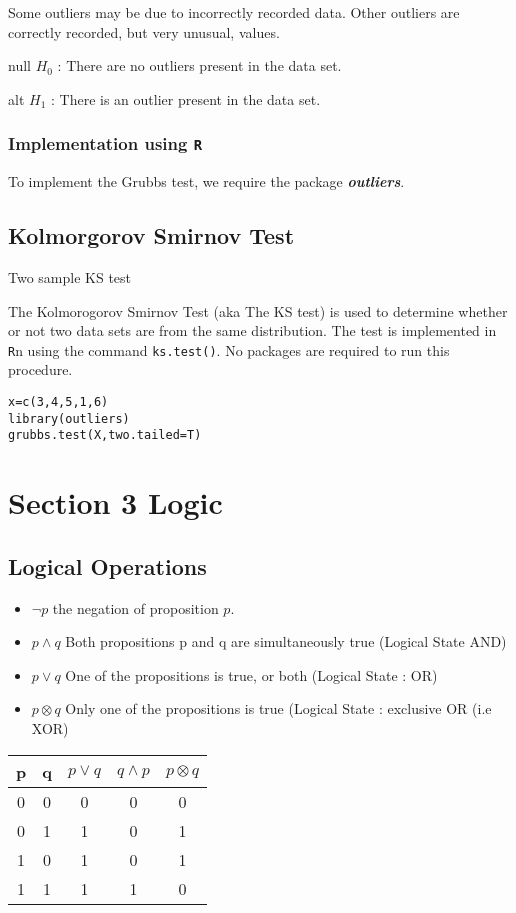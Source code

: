 \documentclass[12pt]{article} %
\begin{document}
Some outliers may be due to incorrectly recorded data. Other outliers are correctly recorded, but very unusual, values.

null $H_0$ : There are no outliers present in the data set.

alt $H_1$ : There is an outlier present in the data set.

\subsubsection{Implementation using \texttt{R}}
To implement the Grubbs test, we require the package \textbf{\textit{outliers}}.

\subsection{Kolmorgorov Smirnov Test}
Two sample KS test

The Kolmorogorov Smirnov Test (aka The KS test) is used to determine whether or not two data sets are from the same distribution.
The test is implemented in \texttt{R}n using the command \texttt{ks.test()}. No packages are required to run this procedure.




\begin{framed}
\begin{verbatim}
x=c(3,4,5,1,6)
library(outliers)
grubbs.test(X,two.tailed=T)
\end{verbatim}
\end{framed}
\newpage
\section{Section 3 Logic}
\subsection{Logical Operations}
\begin{itemize}
\item $\neg p$ the negation of proposition $p$.
\item $p \wedge q$ Both propositions p and q are simultaneously true (Logical State AND)
\item $p \vee q $ One of the propositions is true, or both (Logical State : OR)
\item $p \otimes q$ Only one of the propositions is true (Logical State : exclusive OR (i.e XOR)
\end{itemize}
\begin{center}
\begin{tabular}{|c|c|c|c|c|}
\hline
p & q & $p \vee q$ & $q \wedge p$ & $p \otimes q$ \\
\hline
0 & 0 & 0 & 0 & 0 \\
0 & 1 & 1 & 0 & 1\\
1 & 0 & 1 & 0 & 1 \\
1 & 1 & 1 & 1 & 0\\
\hline
\end{tabular}
\end{center}
\end{document}
